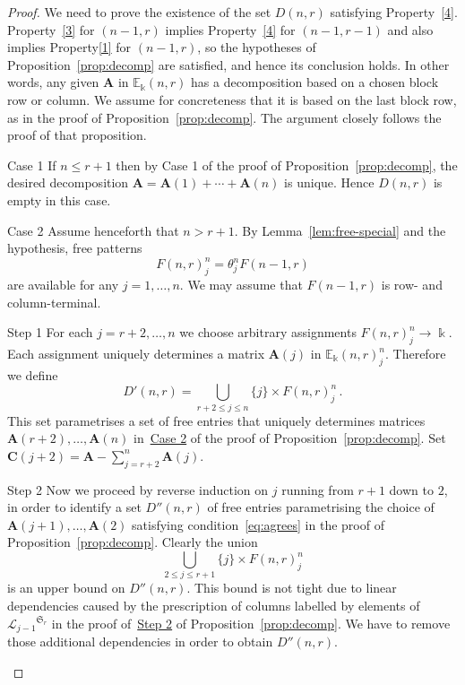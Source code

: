 \documentclass[ALCO,ThmDefs,Unicode,epreuves]{cedram}
\newcommand{\E}{\mathbb{E}}
\newcommand{\Sym}{\mathfrak{S}}
\newcommand{\Lin}{{\mathscr{L}}}
\newcommand{\bA}{\mathbf{A}}
\newcommand{\bC}{\mathbf{C}}
\begin{document}
\begin{proof}
We need to prove the existence of the set $D(n,r)$ satisfying
Property~\ref{4}. Property~\ref{3} for $(n-1,r)$ implies
Property~\ref{4} for $(n-1,r-1)$ and also implies Property\ref{1} for
$(n-1,r)$, so the hypotheses of Proposition~\ref{prop:decomp} are
satisfied, and hence its conclusion holds. In other words, any given
$\bA$ in $\E_\Bbbk(n,r)$ has a decomposition based on a chosen block
row or column. We assume for concreteness that it is based on the last
block row, as in the proof of Proposition~\ref{prop:decomp}. The
argument closely follows the proof of that proposition.

\begin{enonce*}[remark]{\hypertarget{prop6.13_C1}{Case 1}} If $n \le r+1$ then by Case 1 of
the proof of Proposition~\ref{prop:decomp}, the desired decomposition
$\bA = \bA(1) + \cdots+ \bA(n)$ is unique. Hence $D(n,r)$ is empty in
this case.
\end{enonce*}

\begin{enonce*}[remark]{\hypertarget{prop6.13_C1}{Case 2}} Assume henceforth that $n > r+1$.
By Lemma~\ref{lem:free-special} and the hypothesis, free patterns
\[F(n,r)^n_j = \theta^n_j F(n-1,r)\] are available for any
$j=1,\dots, n$. We may assume that $F(n-1,r)$ is row- and
column-terminal.
\end{enonce*}

\begin{enonce*}[remark]{\hypertarget{prop6.13_S1}{Step 1}} For each $j=r+2, \dots, n$ we choose arbitrary
assignments $F(n,r)^n_j \to \Bbbk$. Each assignment uniquely
determines a matrix $\bA(j)$ in $\E_\Bbbk(n,r)_j^n$. Therefore we
define
\begin{equation*}
D'(n,r) = \bigcup_{r+2 \le j \le n} \{j\}\times F(n,r)^n_j \, .
\end{equation*}
This set parametrises a set of free entries that uniquely determines
matrices $\bA(r+2), \dots, \bA(n)$ in~\hyperlink{Case 2}{Case 2} of the proof of
Proposition~\ref{prop:decomp}. Set $\bC(j+2) = \bA - \sum_{j=r+2}^n
\bA(j)$.
\end{enonce*}

\begin{enonce*}[remark]{\hypertarget{prop6.13_S1}{Step 2}} Now we proceed by reverse induction on $j$
running from $r+1$ down to $2$, in order to identify a set $D''(n,r)$
of free entries parametrising the choice of $\bA(j+1), \dots, \bA(2)$
satisfying condition~\eqref{eq:agrees} in the proof of Proposition~\ref{prop:decomp}. Clearly the union
\begin{equation*}\label{toomuch2}
\bigcup_{2\leq j \leq r+1} \{j\}\times F(n,r)^n_j 
\end{equation*}
is an upper bound on $D''(n,r)$. This bound is not tight due to linear
dependencies caused by the prescription of columns labelled by
elements of ${\Lin_{j-1}}^{\Sym_r}$ in the proof of~\hyperlink{Step 2}{Step 2} of
Proposition~\ref{prop:decomp}. We have to remove those additional
dependencies in order to obtain $D''(n,r)$.


\end{enonce*}
\end{proof}
\end{document}
